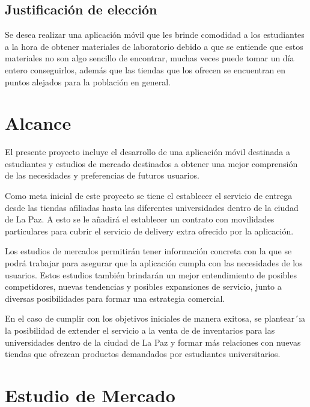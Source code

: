 \documentclass[11pt]{article}
\begin{document}
    \subsection{Justificación de elección} 
    
    Se desea realizar una aplicación móvil que les brinde comodidad a los estudiantes a la hora de obtener materiales de laboratorio debido a que se entiende que estos materiales no son algo sencillo de encontrar, muchas veces puede tomar un día entero conseguirlos, además que las tiendas que los ofrecen se encuentran en puntos alejados para la población en general. 

\newpage
\section{Alcance}

El presente proyecto incluye el desarrollo de una aplicación móvil destinada a estudiantes y estudios de mercado destinados a obtener una mejor comprensión de las necesidades y preferencias de futuros usuarios.

Como meta inicial de este proyecto se tiene el establecer el
servicio de entrega desde las tiendas afiliadas hasta las
diferentes universidades dentro de la ciudad de La Paz.
A esto se le añadirá el establecer un contrato con
movilidades particulares para cubrir el servicio de delivery 
extra ofrecido por la aplicación.


Los estudios de mercados permitirán tener información concreta con la que se podrá trabajar para asegurar que la aplicación cumpla con las necesidades de los usuarios. Estos estudios también brindarán un mejor entendimiento de posibles competidores, nuevas tendencias y posibles expansiones de servicio, junto a diversas posibilidades para formar una estrategia comercial.
 
En el caso de cumplir con los objetivos iniciales de manera 
exitosa, 
se plantear´ıa la posibilidad de extender el servicio 
a la venta de de inventarios para las universidades
 dentro de la ciudad de La Paz y 
formar más relaciones con nuevas tiendas que ofrezcan 
productos demandados por estudiantes universitarios.

\section{Estudio de Mercado}
\end{document}
